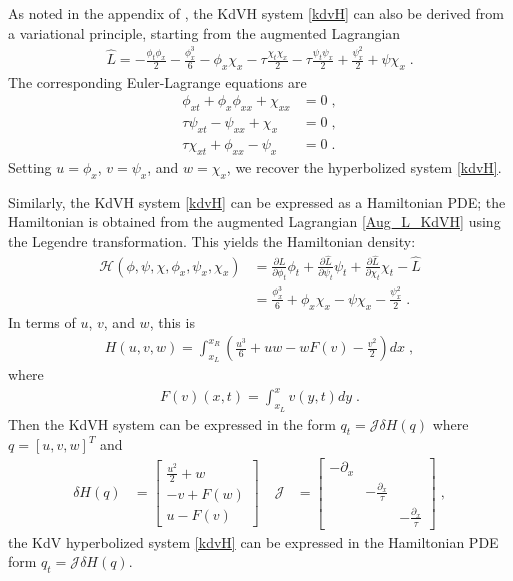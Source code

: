 \documentclass{article}
\begin{document}
As noted in the appendix of \cite{besse2022perfectly}, the KdVH system
\eqref{kdvH} can also be derived from a variational principle, starting
from the augmented Lagrangian
\begin{align}\label{Aug_L_KdVH}
    \hat{L} = -\frac{\phi_t \phi_x}{2} - \frac{\phi_x^3}{6} - \phi_x \chi_x - \tau \frac{\chi_t \chi_x}{2} - \tau \frac{\psi_t \psi_x}{2} + \frac{\psi_x^2}{2} + \psi \chi_x \;.
\end{align}
The corresponding Euler-Lagrange equations are
\begin{subequations}
\begin{align*}
    \phi_{xt} + \phi_x\phi_{xx} + \chi_{xx} &= 0 \;, \\
    \tau \psi_{xt} - \psi_{xx} + \chi_{x} &= 0 \;, \\
    \tau \chi_{xt} + \phi_{xx} - \psi_{x} &= 0 \;.
\end{align*}
\end{subequations}
Setting $u=\phi_x$, $v=\psi_x$, and $w=\chi_x$, we recover the hyperbolized system \eqref{kdvH}.

Similarly, the KdVH system \eqref{kdvH} can be expressed as a Hamiltonian PDE; the Hamiltonian is
obtained from the augmented Lagrangian \eqref{Aug_L_KdVH} using the Legendre
transformation. This yields the Hamiltonian density:
\begin{align*}
    \mathcal{H}(\phi, \psi, \chi, \phi_x, \psi_x, \chi_x) &= \frac{\partial \hat{L}}{\partial \phi_t} \phi_t + \frac{\partial \hat{L}}{\partial \psi_t} \psi_t + \frac{\partial \hat{L}}{\partial \chi_t} \chi_t - \hat{L} \\
    &= \frac{\phi_x^3}{6} + \phi_x \chi_x - \psi \chi_x - \frac{\psi_x^2}{2} \;.
\end{align*}
In terms of $ u $, $ v $, and $ w $, this is
\begin{align}
    H(u, v, w) = \int_{x_L}^{x_R} \left(\frac{u^3}{6} + uw - wF(v) - \frac{v^2}{2}\right) dx \;,
\end{align}
where
\begin{align*}
    F(v)(x,t) = \int_{x_L}^{x} v(y,t) dy \;.
\end{align*}
Then the KdVH system can be expressed in the form $q_t = \mathcal{J} \delta H(q)$ where
$q=[u,v,w]^T$ and
\begin{align}
    \delta H(q) & =
    \begin{bmatrix}
        \frac{u^2}{2} + w \\
        -v + F(w) \\
        u - F(v)
    \end{bmatrix} \; &
    \mathcal{J} & =
    \begin{bmatrix}
        -\partial_x & &  \\
        & -\frac{\partial_x}{\tau} & \\
        &  & -\frac{\partial_x}{\tau}
    \end{bmatrix} \;,
\end{align}
the KdV hyperbolized system \eqref{kdvH} can be expressed in the Hamiltonian PDE form $ q_t = \mathcal{J} \delta H(q) $.
\end{document}
